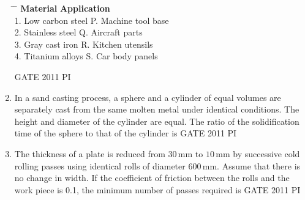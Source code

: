 \documentclass[journal,12pt,onecolumn]{IEEEtran}
\theoremstyle{remark}
\begin{document}
\begin{enumerate}
\begin{tabbing}
    \hspace{6cm} \= \hspace{4cm} \= \kill
    \textbf{Material} \> \textbf{Application} \\[6pt]
    1. Low carbon steel \> P. Machine tool base \\
    2. Stainless steel \> Q. Aircraft parts \\
    3. Gray cast iron \> R. Kitchen utensils \\
    4. Titanium alloys \> S. Car body panels \\
\end{tabbing}
\hfill{GATE 2011 PI}
\begin{enumerate}
\end{enumerate}

\item
In a sand casting process, a sphere and a cylinder of equal volumes are separately cast from the same molten metal under identical conditions. The height and diameter of the cylinder are equal. The ratio of the solidification time of the sphere to that of the cylinder is
\hfill{GATE 2011 PI}
\begin{enumerate}
\end{enumerate}

\item
The thickness of a plate is reduced from $30\, \mathrm{mm}$ to $10\, \mathrm{mm}$ by successive cold rolling passes using identical rolls of diameter $600\, \mathrm{mm}$. Assume that there is no change in width. If the coefficient of friction between the rolls and the work piece is 0.1, the minimum number of passes required is
\hfill{GATE 2011 PI}
\begin{enumerate}
\end{enumerate}


\end{enumerate}
\end{document}
